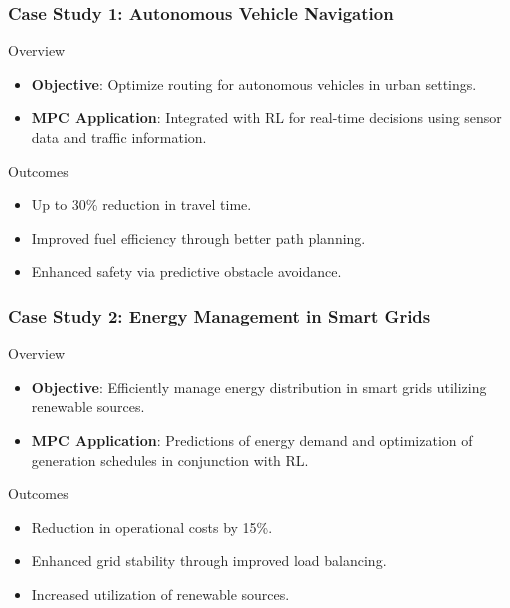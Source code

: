 \documentclass[aspectratio=169]{beamer}
\begin{document}
\begin{frame}[fragile]
    \frametitle{Case Study 1: Autonomous Vehicle Navigation}
    \begin{block}{Overview}
        \begin{itemize}
            \item \textbf{Objective}: Optimize routing for autonomous vehicles in urban settings.
            \item \textbf{MPC Application}: Integrated with RL for real-time decisions using sensor data and traffic information.
        \end{itemize}
    \end{block}
    \begin{block}{Outcomes}
        \begin{itemize}
            \item Up to 30\% reduction in travel time.
            \item Improved fuel efficiency through better path planning.
            \item Enhanced safety via predictive obstacle avoidance.
        \end{itemize}
    \end{block}
\end{frame}

\begin{frame}[fragile]
    \frametitle{Case Study 2: Energy Management in Smart Grids}
    \begin{block}{Overview}
        \begin{itemize}
            \item \textbf{Objective}: Efficiently manage energy distribution in smart grids utilizing renewable sources.
            \item \textbf{MPC Application}: Predictions of energy demand and optimization of generation schedules in conjunction with RL.
        \end{itemize}
    \end{block}
    \begin{block}{Outcomes}
        \begin{itemize}
            \item Reduction in operational costs by 15\%.
            \item Enhanced grid stability through improved load balancing.
            \item Increased utilization of renewable sources.
        \end{itemize}
    \end{block}
\end{frame}
\end{document}
